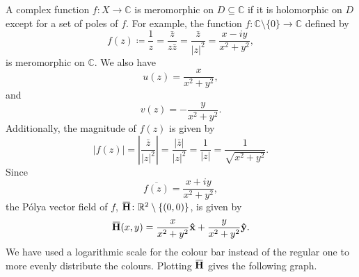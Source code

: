 \documentclass[a4paper]{article}
\newcommand{\R}{\mathbb{R}}
\newcommand{\C}{\mathbb{C}}
\newcommand{\overbar}[1]{\mkern 1.5mu\overline{\mkern-1.5mu#1\mkern-1.5mu}\mkern 1.5mu}
\theoremstyle{definition}
\begin{document}
A complex function $f \colon X \to \C$ is meromorphic on $D \subseteq \C$ if it is holomorphic on $D$ except for a set of poles of $f$.
For example, the function $f \colon \C \setminus \{0\} \to \C$ defined by
\begin{equation*}
    f(z) \coloneq \frac{1}{z} = \frac{\bar{z}}{z\bar{z}} = \frac{\bar{z}}{\lvert z \rvert^2} = \frac{x - iy}{x^2 + y^2},
\end{equation*}
is meromorphic on $\C$.
We also have
\begin{equation*}
    u(z) = \frac{x}{x^2+y^2},
\end{equation*}
and
\begin{equation*}
    v(z) = -\frac{y}{x^2+y^2}.
\end{equation*}
Additionally, the magnitude of $f(z)$ is given by
\begin{equation*}
    \lvert f(z) \rvert = \left\lvert \frac{\bar{z}}{\lvert z \rvert^2} \right\rvert = \frac{\lvert \bar{z} \rvert}{\lvert z \rvert^2} = \frac{1}{\lvert z \rvert} = \frac{1}{\sqrt{x^2+y^2}}.
\end{equation*}
Since
\begin{equation*}
    \overline{f(z)} = \frac{x+iy}{x^2+y^2},
\end{equation*}
the P\'olya vector field of $f$, $\mathbf{\overbar{H}} \colon \R^2 \setminus \{(0,0)\}$, is given by
\begin{equation*}
    \mathbf{\overbar{H}}(x,y) = \frac{x}{x^2+y^2} \mathbf{\hat{x}} + \frac{y}{x^2+y^2} \mathbf{\hat{y}}.
\end{equation*}
We have used a logarithmic scale for the colour bar instead of the regular one to more evenly distribute the colours.
Plotting $\mathbf{\overbar{H}}$ gives the following graph.
\end{document}
